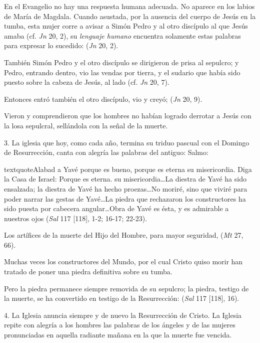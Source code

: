 \begin{body}
En el Evangelio no hay una respuesta humana adecuada. No aparece en los labios de María de Magdala. Cuando asustada, por la ausencia del cuerpo de Jesús en la tumba, esta mujer corre a avisar a Simón Pedro y al otro discípulo al que Jesús amaba (cf. \textit{Jn} 20, 2), su \textit{lenguaje humano} encuentra solamente estas palabras para expresar lo sucedido:  (\textit{Jn} 20, 2).

También Simón Pedro y el otro discípulo se dirigieron de prisa al sepulcro; y Pedro, entrando dentro, vio las vendas por tierra, y el sudario que había sido puesto sobre la cabeza de Jesús, al lado (cf. \textit{Jn} 20, 7).

Entonces entró también el otro discípulo, vio y creyó;  (\textit{Jn} 20, 9).

Vieron y comprendieron que los hombres no habían logrado derrotar a Jesús con la losa sepulcral, sellándola con la señal de la muerte.

3. La iglesia que hoy, como cada año, termina su triduo pascual con el Domingo de Resurrección, canta con alegría las palabras del antiguo: Salmo: 

textquote{Alabad a Yavé porque es bueno, porque es eterna su misericordia. Diga la Casa de Israel: Porque es eterna. su misericordia\ldots La diestra de Yavé ha sido ensalzada; la diestra de Yavé ha hecho proezas\ldots No moriré, sino que viviré para poder narrar las gestas de Yavé\ldots La piedra que rechazaron los constructores ha sido puesta por cabecera angular\ldots Obra de Yavé es ésta, y es admirable a nuestros ojos} (\textit{Sal} 117 [118], 1-2; 16-17; 22-23).

Los artífices de la muerte del Hijo del Hombre, para mayor seguridad,  (\textit{Mt} 27, 66).

Muchas veces los constructores del Mundo, por el cual Cristo quiso morir han tratado de poner una piedra definitiva sobre su tumba.

Pero la piedra permanece siempre removida de su sepulcro; la piedra, testigo de la muerte, se ha convertido en testigo de la Resurrección:  (\textit{Sal} 117 [118], 16).

4. La Iglesia anuncia siempre y de nuevo la Resurrección de Cristo. La Iglesia repite con alegría a los hombres las palabras de los ángeles y de las mujeres pronunciadas en aquella radiante mañana en la que la muerte fue vencida.


\end{body}
